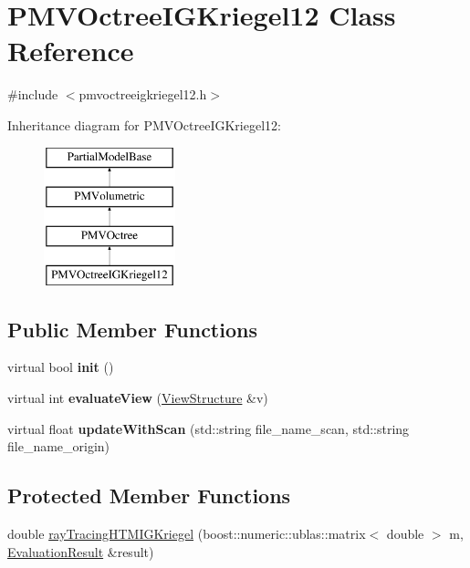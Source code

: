 \hypertarget{classPMVOctreeIGKriegel12}{}\section{P\+M\+V\+Octree\+I\+G\+Kriegel12 Class Reference}
\label{classPMVOctreeIGKriegel12}


{\ttfamily \#include $<$pmvoctreeigkriegel12.\+h$>$}

Inheritance diagram for P\+M\+V\+Octree\+I\+G\+Kriegel12\+:\begin{figure}[H]
\begin{center}
\leavevmode
\includegraphics[height=4.000000cm]{classPMVOctreeIGKriegel12}
\end{center}
\end{figure}
\subsection*{Public Member Functions}
\begin{DoxyCompactItemize}
\item 
virtual bool {\bfseries init} ()\hypertarget{classPMVOctreeIGKriegel12_af7acc855c6276f22fe7c8736cfd2ed82}{}\label{classPMVOctreeIGKriegel12_af7acc855c6276f22fe7c8736cfd2ed82}

\item 
virtual int {\bfseries evaluate\+View} (\hyperlink{classViewStructure}{View\+Structure} \&v)\hypertarget{classPMVOctreeIGKriegel12_a8744c422b2a9b11859560aa98e8d2f7d}{}\label{classPMVOctreeIGKriegel12_a8744c422b2a9b11859560aa98e8d2f7d}

\item 
virtual float {\bfseries update\+With\+Scan} (std\+::string file\+\_\+name\+\_\+scan, std\+::string file\+\_\+name\+\_\+origin)\hypertarget{classPMVOctreeIGKriegel12_aa8720c9fedbfab494aa8cb21848c6b54}{}\label{classPMVOctreeIGKriegel12_aa8720c9fedbfab494aa8cb21848c6b54}

\end{DoxyCompactItemize}
\subsection*{Protected Member Functions}
\begin{DoxyCompactItemize}
\item 
double \hyperlink{classPMVOctreeIGKriegel12_a9020231b50f8520fea577e41c5d0a44c}{ray\+Tracing\+H\+T\+M\+I\+G\+Kriegel} (boost\+::numeric\+::ublas\+::matrix$<$ double $>$ m, \hyperlink{classEvaluationResult}{Evaluation\+Result} \&result)
\end{DoxyCompactItemize}
